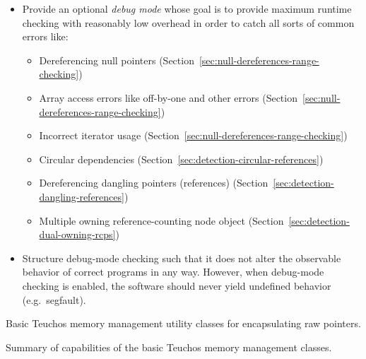\documentclass[pdf,ps2pdf,11pt]{SANDreport}
\begin{document}
\begin{itemize}
{}\item Provide an optional {}\textit{debug mode} whose goal is to
provide maximum runtime checking with reasonably low overhead in order
to catch all sorts of common errors like:

  \begin{itemize}

  {}\item Dereferencing null pointers
  (Section~\ref{sec:null-dereferences-range-checking})

  {}\item Array access errors like off-by-one and other errors
  (Section~\ref{sec:null-dereferences-range-checking})

  {}\item Incorrect iterator usage
  (Section~\ref{sec:null-dereferences-range-checking})

  {}\item Circular dependencies
  (Section~\ref{sec:detection-circular-references})

  {}\item Dereferencing dangling pointers (references)
  (Section~\ref{sec:detection-dangling-references})

  {}\item Multiple owning reference-counting node object
  (Section~\ref{sec:detection-dual-owning-rcps})

  \end{itemize}

{}\item Structure debug-mode checking such that it does not alter the
observable behavior of correct programs in any way.  However, when
debug-mode checking is enabled, the software should never yield
undefined behavior (e.g.\ segfault).

\end{itemize}


\begin{table}
\begin{center}

\end{center}
\caption{\label{tbl:BasicSingleArrayTypes}
Basic Teuchos memory management utility classes for encapsulating raw
pointers.}
\end{table}


\begin{table}
\begin{center}

\end{center}
\caption{\label{tbl:TypesSummary}
Summary of capabilities of the basic Teuchos memory management
classes.}
\end{table}
\end{document}
